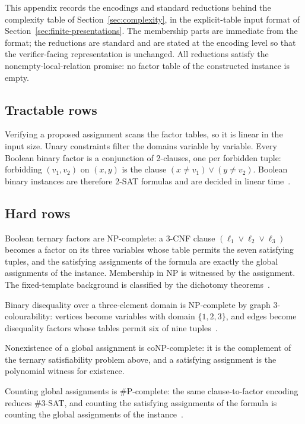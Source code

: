 \documentclass[11pt]{article}
\theoremstyle{plain}
\theoremstyle{definition}
\theoremstyle{remark}
\begin{document}
This appendix records the encodings and standard reductions behind the
complexity table of Section~\ref{sec:complexity}, in the explicit-table
input format of Section~\ref{sec:finite-presentations}.  The membership
parts are immediate from the format; the reductions are standard and are
stated at the encoding level so that the verifier-facing representation is
unchanged.  All reductions satisfy the nonempty-local-relation promise: no
factor table of the constructed instance is empty.

\subsection{Tractable rows}

Verifying a proposed assignment scans the factor tables, so it is linear in
the input size.  Unary constraints filter the domains variable by variable.
Every Boolean binary factor is a conjunction of 2-clauses, one per forbidden
tuple: forbidding \((v_1,v_2)\) on \((x,y)\) is the clause
\((x\ne v_1)\lor(y\ne v_2)\).  Boolean binary instances are therefore
2-SAT formulas and are decided in linear time~\cite{apt79}.

\subsection{Hard rows}
\label{subsec:hard-rows}

Boolean ternary factors are NP-complete: a 3-CNF clause
\((\ell_1\lor\ell_2\lor\ell_3)\) becomes a factor on its three variables
whose table permits the seven satisfying tuples, and the satisfying
assignments of the formula are exactly the global assignments of the
instance.  Membership in NP is witnessed by the assignment.  The
fixed-template background is classified by the dichotomy
theorems~\cite{schaefer78,zhuk17}.

Binary disequality over a three-element domain is NP-complete by graph
3-colourability: vertices become variables with domain \(\{1,2,3\}\), and
edges become disequality factors whose tables permit six of nine
tuples~\cite{gareyjohnson79}.

Nonexistence of a global assignment is coNP-complete: it is the complement
of the ternary satisfiability problem above, and a satisfying assignment is
the polynomial witness for existence.

Counting global assignments is \#P-complete: the same clause-to-factor
encoding reduces \#3-SAT, and counting the satisfying assignments of the
formula is counting the global assignments of the
instance~\cite{valiant79,creignou-hermann96}.
\end{document}
